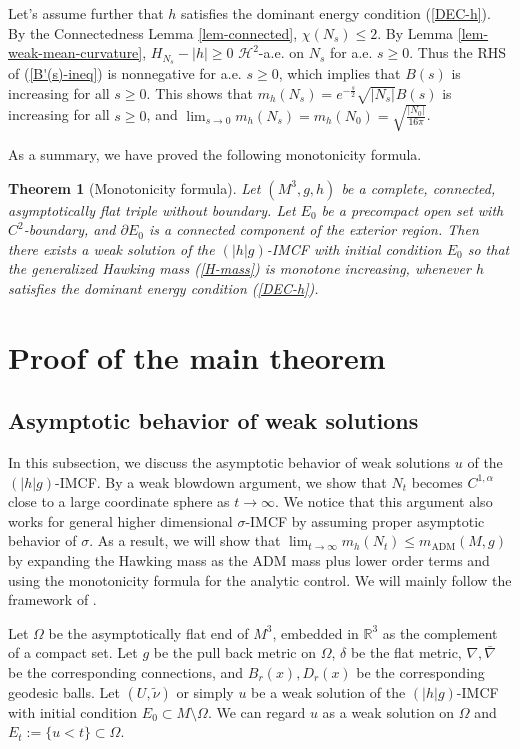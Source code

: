 \documentclass[11pt, letterpaper]{amsart}
\newtheorem{thm}{Theorem}[section]
\theoremstyle{definition}
\theoremstyle{remark}
\begin{document}
Let's assume further that $h$ satisfies the dominant energy condition (\ref{DEC-h}). By the Connectedness Lemma \ref{lem-connected}, $\chi (N_{s}) \leq 2$.  By Lemma \ref{lem-weak-mean-curvature}, $H_{N_s} - |h| \geq 0$  $\mathcal{H}^2$-a.e. on $N_{s}$ for a.e. $s \geq 0$. Thus the RHS of (\ref{B'(s)-ineq}) is nonnegative for a.e. $s \geq 0$, which implies that $B(s)$ is increasing for all $s \geq 0$. This shows that $m_h(N_s) = e ^{-\frac{s}{2}} \sqrt{|N_s|} B(s)$ is increasing for all $s \geq 0$, and $\lim_{s\to 0} m_{h}(N_s) = m_{h}(N_0) = \sqrt{\frac{|N_0|}{16 \pi }} $. 

As a summary, we have proved the following monotonicity formula.



\begin{thm}[Monotonicity formula]\label{thm-monotonicity-connected}
	Let $(M^3, g, h)$ be a complete, connected, asymptotically flat triple without boundary. Let $E_0$ be a precompact open set with $C^{2}$-boundary, and $\partial E_0$ is a connected component of the exterior region. Then there exists a weak solution of the $(|h| g)$-IMCF with initial condition $E_0$ so that the generalized Hawking mass (\ref{H-mass}) is monotone increasing,	whenever $h$ satisfies the dominant energy condition (\ref{DEC-h}). 
\end{thm}

\section{Proof of the main theorem}\label{sect-proof-main}

\subsection{Asymptotic behavior of weak solutions}
In this subsection, we discuss the asymptotic behavior of weak solutions $u$ of the $(|h| g) $-IMCF. By a weak blowdown argument, we show that $N_{t}$ becomes $C^{1, \alpha }$ close to a large coordinate sphere as $t\to \infty$. We notice that this argument also works for general higher dimensional $\sigma $-IMCF by assuming proper asymptotic behavior of $\sigma $. As a result, we will show that $\lim_{t\to \infty} m_h(N_t) \leq m_{\mathrm{ADM}}(M, g) $ by expanding the Hawking mass as the ADM mass plus lower order terms and using the monotonicity formula for the analytic control. We will mainly follow the framework of \cite[Section 7]{HI01}.

Let $\Omega $ be the asymptotically flat end of $M^3$, embedded in $\mathbb{R}^{3}$ as the complement of a compact set. Let $g$ be the pull back metric on $\Omega $, $\delta $ be the flat metric, $\nabla , \bar{\nabla }$ be the corresponding connections, and $B_r(x), D_r(x)$ be the corresponding geodesic balls. Let $(U, \tilde{\nu })$ or simply $u$ be a weak solution of the $(|h|g)$-IMCF with initial condition $E_0 \subset M \setminus \Omega $. We can regard $u$ as a weak solution on $\Omega $ and $E _{t}:= \{ u < t\} \subset \Omega $.
\end{document}
